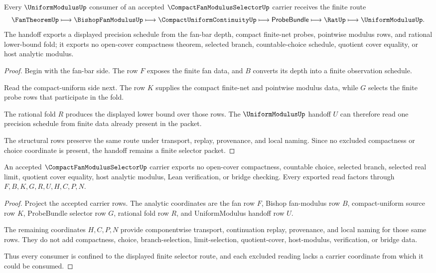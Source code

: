 \begin{theorem}
\label{thm:compact-fan-modulus-selector-uniform-handoff}
Every $\UniformModulusUp$ consumer of an accepted $\CompactFanModulusSelectorUp$ carrier receives the finite route
$$
\FanTheoremUp \longmapsto \BishopFanModulusUp \longmapsto \CompactUniformContinuityUp \longmapsto \mathsf{ProbeBundle} \longmapsto \RatUp \longmapsto \UniformModulusUp .
$$
The handoff exports a displayed precision schedule from the fan-bar depth, compact finite-net probes, pointwise modulus rows, and rational lower-bound fold; it exports no open-cover compactness theorem, selected branch, countable-choice schedule, quotient cover equality, or host analytic modulus.
\end{theorem}
\begin{proof}
Begin with the fan-bar side. The row $F$ exposes the finite fan data, and $B$ converts its depth into a finite observation schedule.

Read the compact-uniform side next. The row $K$ supplies the compact finite-net and pointwise modulus data, while $G$ selects the finite probe rows that participate in the fold.

The rational fold $R$ produces the displayed lower bound over those rows. The $\UniformModulusUp$ handoff $U$ can therefore read one precision schedule from finite data already present in the packet.

The structural rows preserve the same route under transport, replay, provenance, and local naming. Since no excluded compactness or choice coordinate is present, the handoff remains a finite selector packet.
\end{proof}

\begin{theorem}
\label{thm:compact-fan-modulus-selector-nonescape}
An accepted $\CompactFanModulusSelectorUp$ carrier exports no open-cover compactness, countable choice, selected branch, selected real limit, quotient cover equality, host analytic modulus, Lean verification, or bridge checking. Every exported read factors through $F,B,K,G,R,U,H,C,P,N$.
\end{theorem}
\begin{proof}
Project the accepted carrier rows. The analytic coordinates are the fan row $F$, Bishop fan-modulus row $B$, compact-uniform source row $K$, ProbeBundle selector row $G$, rational fold row $R$, and UniformModulus handoff row $U$.

The remaining coordinates $H,C,P,N$ provide componentwise transport, continuation replay, provenance, and local naming for those same rows. They do not add compactness, choice, branch-selection, limit-selection, quotient-cover, host-modulus, verification, or bridge data.

Thus every consumer is confined to the displayed finite selector route, and each excluded reading lacks a carrier coordinate from which it could be consumed.
\end{proof}

